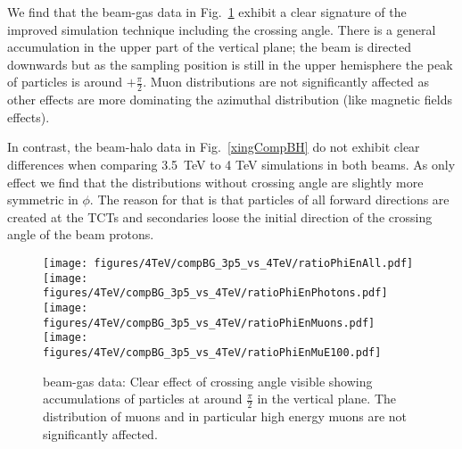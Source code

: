 We find that the beam-gas data in Fig.~\ref{xingCompBG} exhibit a clear signature of the improved simulation technique including the crossing angle. There is a general accumulation in the upper part of the vertical plane; the beam is directed downwards but as the sampling position is still in the upper hemisphere the peak of particles is around $+ \frac{\pi}{2}$. Muon distributions are not significantly affected as other effects are more dominating the azimuthal distribution (like magnetic fields effects). 

In contrast, the beam-halo data in Fig.~\ref{xingCompBH} do not exhibit clear differences when comparing 3.5~TeV to 4 TeV simulations in both beams. As only effect we find that the distributions without crossing angle are slightly more symmetric in $\phi$. The reason for that is that particles of all forward directions are created at the TCTs and secondaries loose the initial direction of the crossing angle of the beam protons.

\begin{figure}
\begin{center}
  \texttt{[image: figures/4TeV/compBG\_3p5\_vs\_4TeV/ratioPhiEnAll.pdf]}
  \texttt{[image: figures/4TeV/compBG\_3p5\_vs\_4TeV/ratioPhiEnPhotons.pdf]}
  \texttt{[image: figures/4TeV/compBG\_3p5\_vs\_4TeV/ratioPhiEnMuons.pdf]}
  \texttt{[image: figures/4TeV/compBG\_3p5\_vs\_4TeV/ratioPhiEnMuE100.pdf]}
\end{center}
\vspace{-0.6cm}
 \caption{beam-gas data: Clear effect of crossing angle visible showing accumulations of particles at around $\frac{\pi}{2}$ in the vertical plane. The distribution of muons and in particular high energy muons are not significantly affected.
  \label{xingCompBG}}
\end{figure}


